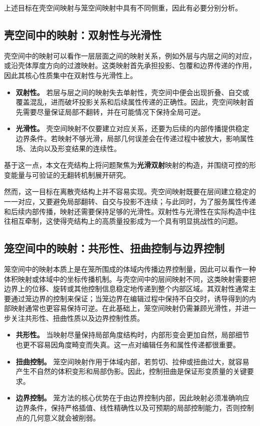 上述目标在壳空间映射与笼空间映射中具有不同侧重，因此有必要分别分析。

\subsection{壳空间中的映射：双射性与光滑性}

壳空间中的映射可以看作一层层面之间的映射关系，例如外层与内层之间的对应，或沿壳体厚度方向的过渡映射。这类映射首先承担投影、包覆和边界传递的作用，因此其核心性质集中在双射性与光滑性上。

\begin{itemize}
  \item \textbf{双射性。} 若层与层之间的映射失去单射性，壳空间中便会出现折叠、自交或覆盖混乱，进而破坏投影关系和后续属性传递的正确性。因此，壳空间映射首先需要尽量保证局部不翻转，并在可能情况下保持全局可逆。
  \item \textbf{光滑性。} 壳空间映射不仅要建立对应关系，还要为后续的内部传播提供稳定边界条件。若映射不够光滑，局部几何误差会在传递过程中被放大，影响属性场、法向以及形变结果的连续性。
\end{itemize}

基于这一点，本文在壳结构上将问题聚焦为\textbf{光滑双射}映射的构造，并围绕可控的形变能量与可验证的无翻转机制展开研究。

然而，这一目标在离散壳结构上并不容易实现。壳空间映射既要在层间建立稳定的一一对应，又要避免局部翻转、自交与投影不连续；与此同时，为了服务属性传递和后续内部传播，映射还需要保持足够的光滑性。双射性与光滑性在实际构造中往往相互牵制，这使得壳结构上的高质量投影成为一个具有明显挑战性的问题。

\subsection{笼空间中的映射：共形性、扭曲控制与边界控制}

笼空间中的映射本质上是在笼所围成的体域内传播边界控制量，因此可以看作一种体积映射或体域中的坐标传播机制。与壳空间中的层间映射不同，这类映射需要把边界上的位移、旋转或其他控制信息稳定地传递到整个内部区域。其双射性通常主要通过笼边界的控制来保证；当笼边界在编辑过程中保持不自交时，诱导得到的内部映射通常也更容易保持可逆。在此基础上，笼空间映射仍需兼顾光滑性，并进一步关注共形性、扭曲性质以及边界控制性质。

\begin{itemize}
  \item \textbf{共形性。} 当映射尽量保持局部角度结构时，内部形变会更加自然，局部细节也更不容易因角度畸变而失真。这一点对编辑任务和属性传递都很重要。
  \item \textbf{扭曲控制。} 笼空间映射作用于体域内部，若剪切、拉伸或扭曲过大，就容易产生不自然的体积变形和局部伪影。因此，控制扭曲是保证形变质量的关键要求。
  \item \textbf{边界控制。} 笼方法的核心优势在于由边界控制内部，因此映射必须准确响应边界条件，保持严格插值、线性精确性以及可预期的局部控制能力，否则控制点的几何意义就会被削弱。
\end{itemize}

